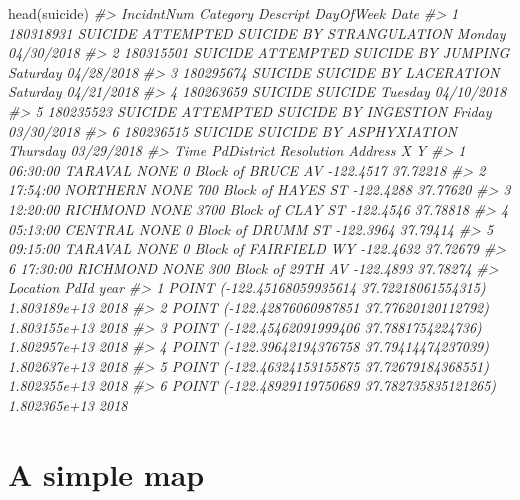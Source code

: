 \documentclass[
  12pt,
]{book}
\newenvironment{Shaded}{\begin{snugshade}}{\end{snugshade}}
\newcommand{\CommentTok}[1]{\textcolor[rgb]{0.37,0.37,0.37}{\textit{#1}}}
\newcommand{\FunctionTok}[1]{\textcolor[rgb]{0,0,0}{#1}}
\newcommand{\NormalTok}[1]{#1}
\begin{document}
\begin{Shaded}
\begin{Highlighting}[]
\FunctionTok{head}\NormalTok{(suicide)}
\CommentTok{\#\textgreater{}   IncidntNum Category                           Descript DayOfWeek       Date}
\CommentTok{\#\textgreater{} 1  180318931  SUICIDE ATTEMPTED SUICIDE BY STRANGULATION    Monday 04/30/2018}
\CommentTok{\#\textgreater{} 2  180315501  SUICIDE       ATTEMPTED SUICIDE BY JUMPING  Saturday 04/28/2018}
\CommentTok{\#\textgreater{} 3  180295674  SUICIDE              SUICIDE BY LACERATION  Saturday 04/21/2018}
\CommentTok{\#\textgreater{} 4  180263659  SUICIDE                            SUICIDE   Tuesday 04/10/2018}
\CommentTok{\#\textgreater{} 5  180235523  SUICIDE     ATTEMPTED SUICIDE BY INGESTION    Friday 03/30/2018}
\CommentTok{\#\textgreater{} 6  180236515  SUICIDE            SUICIDE BY ASPHYXIATION  Thursday 03/29/2018}
\CommentTok{\#\textgreater{}       Time PdDistrict Resolution                 Address         X        Y}
\CommentTok{\#\textgreater{} 1 06:30:00    TARAVAL       NONE     0 Block of BRUCE AV {-}122.4517 37.72218}
\CommentTok{\#\textgreater{} 2 17:54:00   NORTHERN       NONE   700 Block of HAYES ST {-}122.4288 37.77620}
\CommentTok{\#\textgreater{} 3 12:20:00   RICHMOND       NONE   3700 Block of CLAY ST {-}122.4546 37.78818}
\CommentTok{\#\textgreater{} 4 05:13:00    CENTRAL       NONE     0 Block of DRUMM ST {-}122.3964 37.79414}
\CommentTok{\#\textgreater{} 5 09:15:00    TARAVAL       NONE 0 Block of FAIRFIELD WY {-}122.4632 37.72679}
\CommentTok{\#\textgreater{} 6 17:30:00   RICHMOND       NONE    300 Block of 29TH AV {-}122.4893 37.78274}
\CommentTok{\#\textgreater{}                                         Location         PdId year}
\CommentTok{\#\textgreater{} 1  POINT ({-}122.45168059935614 37.72218061554315) 1.803189e+13 2018}
\CommentTok{\#\textgreater{} 2  POINT ({-}122.42876060987851 37.77620120112792) 1.803155e+13 2018}
\CommentTok{\#\textgreater{} 3   POINT ({-}122.45462091999406 37.7881754224736) 1.802957e+13 2018}
\CommentTok{\#\textgreater{} 4  POINT ({-}122.39642194376758 37.79414474237039) 1.802637e+13 2018}
\CommentTok{\#\textgreater{} 5  POINT ({-}122.46324153155875 37.72679184368551) 1.802355e+13 2018}
\CommentTok{\#\textgreater{} 6 POINT ({-}122.48929119750689 37.782735835121265) 1.802365e+13 2018}
\end{Highlighting}
\end{Shaded}

\hypertarget{a-simple-map}{%
\section{A simple map}\label{a-simple-map}}
\end{document}
